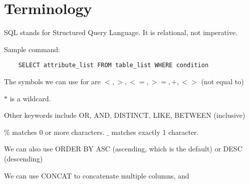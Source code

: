 \documentclass[english]{exam}
\begin{document}
	
    \section{Terminology}
    
    SQL stands for Structured Query Language. It is relational, not imperative.
    
    Sample command: 
    
    \begin{lstlisting}
    SELECT attribute_list FROM table_list WHERE condition
    \end{lstlisting}
    
    The symbols we can use for are $<, >, <=, >=, +, <>$ (not equal to)
    
    $*$ is a wildcard.
    
    Other keywords include OR, AND, DISTINCT, LIKE, BETWEEN (inclusive)
    
    $\%$ matches 0 or more characters. $\_$ matches exactly 1 character. 
    
    We can also use ORDER BY  ASC (ascending, which is the default) or DESC (descending)
    
    We can use CONCAT to concatenate multiple columns, and 
    
    
\end{document}

